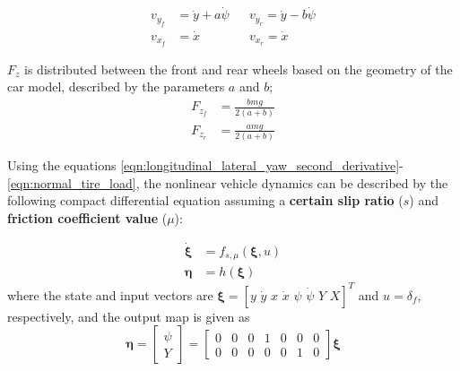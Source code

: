 \documentclass[12pt]{article}
\begin{document}
\begin{subequations} 
	\begin{align} 
	v_{y_{f}} &= \dot{y} + a\dot{\psi} &&v_{y_{r}} = \dot{y} - b\dot{\psi} \label{eqn:lateral_wheel_velocities_I} \\
	v_{x_{f}} &= \dot{x}  &&v_{x_{r}} = \dot{x} \label{eqn:longitudinal_wheel_velocities_II}
	\end{align} 
\end{subequations}
\par $F_{z}$ is distributed between the front and rear wheels based on the geometry of the car model, described by the parameters $a$ and $b$;
\begin{subequations} 
	\label{eqn:normal_tire_load}
	\begin{align} 
	F_{z_{f}} &= \frac{bmg}{2(a+b)} 
	\label{eqn:normal_tire_load_front_wheel} \\
	F_{z_{r}} &= \frac{amg}{2(a+b)} 	 \label{eqn:normal_tire_load_rear_wheel}
	\end{align} 
\end{subequations}
\par Using the equations \ref{eqn:longitudinal_lateral_yaw_second_derivative}-\ref{eqn:normal_tire_load}, the nonlinear vehicle dynamics can be described
 by the following compact differential equation assuming a \textbf{certain slip ratio} ($s$) and \textbf{friction coefficient value} ($\mu$):

\begin{subequations} 
	\label{eqn:nonlinear_system_dynamics}
	\begin{align} 
	\dot{\bm{\xi}} &= f_{s,\mu}(\bm{\xi},u) \\
	\bm{\eta} &= h(\bm{\xi})
	\end{align} 
\end{subequations}
where the state and input vectors are $\bm{\xi}=[y\,\,\dot{y}\,\,x\,\,\dot{x}\,\,{\psi}\,\,\dot{\psi}\,\,Y\,\,X]^{T}$ and $u=\delta_{f}$, respectively, and the output map is given as
\begin{equation}
	\label{eqn:output_eqn}
	{\bm{\eta}} = \begin{bmatrix}
	\psi\\ Y
	\end{bmatrix} = \begin{bmatrix}
	0 & 0 & 0 & 1 & 0 & 0 & 0\\
	0 & 0 & 0 & 0 & 0 & 1 & 0
	\end{bmatrix} \bm{\xi}
\end{equation}
\end{document}
